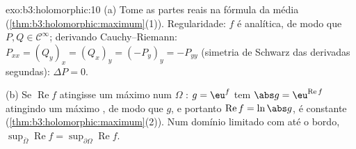 \begin{solution}{exo:b3:holomorphic:10}
(a) Tome as partes reais na fórmula da média
(\cref{thm:b3:holomorphic:maximum}(1)). Regularidade: $f$ é
analítica, de modo que $P, Q \in \mathcal C^\infty$; derivando
Cauchy--Riemann: $P_{xx} = (Q_y)_x = (Q_x)_y = (-P_y)_y =
-P_{yy}$ (simetria de Schwarz das derivadas segundas): $\Delta P =
0$.

(b) Se $\operatorname{Re}f$ atingisse um máximo  num
$\Omega$ : $g = \eu^f$ tem $\abs g =
\eu^{\operatorname{Re}f}$ atingindo um máximo , de modo que
$g$, e portanto $\operatorname{Re}f = \ln\abs g$, é constante
(\cref{thm:b3:holomorphic:maximum}(2)). Num domínio limitado
com  até o bordo,
$\sup_{\bar\Omega}\operatorname{Re}f =
\sup_{\partial\Omega}\operatorname{Re}f$.
\end{solution}

